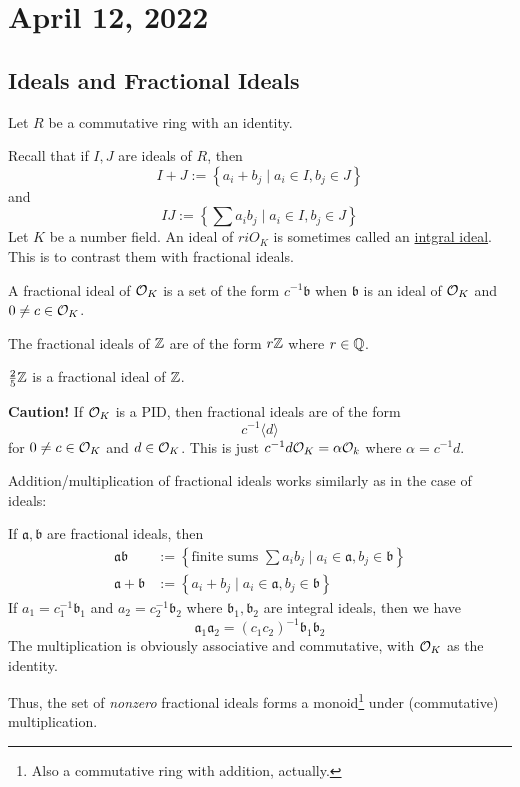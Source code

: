 \section{April 12, 2022}
\subsection{Ideals and Fractional Ideals}
Let $R$ be a commutative ring with an identity.

Recall that if $I, J$ are ideals of $R$, then
\[I + J := \left\{ a_i + b_j \mid a_i\in I, b_j\in J \right\}\]
and
\[IJ := \left\{\sum a_ib_j \mid a_i\in I, b_j\in J\right\}\]
Let $K$ be a number field. An ideal of $riO_K$ is sometimes called an \ul{intgral ideal}. This is to contrast them with fractional ideals.
\begin{definition}
    A fractional ideal of $\mathcal{O}_K$ is a set of the form $c^{-1}\mathfrak{b}$ when $\mathfrak{b}$ is an ideal of $\mathcal{O}_K$ and $0\neq c\in\mathcal{O}_K$.
\end{definition}
\begin{example}
    The fractional ideals of $\mathbb Z$ are of the form $r\mathbb Z$ where $r\in\mathbb Q$.

    $\frac{2}{5}\mathbb Z$ is a fractional ideal of $\mathbb Z$.
\end{example}
\textbf{Caution!} If $\mathcal{O}_K$ is a PID, then fractional ideals are of the form
\[c^{-1}\langle d\rangle\]
for $0\neq c\in\mathcal{O}_K$ and $d\in\mathcal{O}_K$. This is just $c^{-1}d\mathcal{O}_K = \alpha\mathcal{O}_k$ where $\alpha = c^{-1}d$.

Addition/multiplication of fractional ideals works similarly as in the case of ideals:

If $\mathfrak{a}, \mathfrak{b}$ are fractional ideals, then
\begin{align*}
    \mathfrak{a}\mathfrak{b}    & := \left\{ \text{finite sums }\sum a_ib_j\mid a_i\in\mathfrak{a}, b_j\in\mathfrak{b} \right\} \\
    \mathfrak{a} + \mathfrak{b} & := \left\{a_i + b_j\mid a_i\in\mathfrak{a}, b_j\in\mathfrak{b} \right\}
\end{align*}
If $a_1 = c_1^{-1}\mathfrak{b}_1$ and $a_2 = c_2^{-1}\mathfrak{b}_2$ where $\mathfrak{b}_1, \mathfrak{b}_2$ are integral ideals, then we have
\[\mathfrak{a}_1\mathfrak{a}_2 = (c_1c_2)^{-1}\mathfrak{b}_1\mathfrak{b}_2\]
The multiplication is obviously associative and commutative, with $\mathcal{O}_K$ as the identity.

Thus, the set of \emph{nonzero} fractional ideals forms a monoid\footnote{Also a commutative ring with addition, actually.} under (commutative) multiplication.

